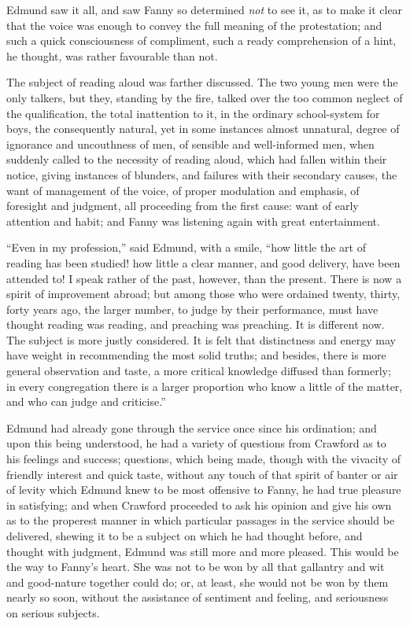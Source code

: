 Edmund saw it all, and saw Fanny so determined \emph{not} to see it,
as to make it clear that the voice was enough to convey
the full meaning of the protestation; and such a quick
consciousness of compliment, such a ready comprehension
of a hint, he thought, was rather favourable than not.

The subject of reading aloud was farther discussed.
The two young men were the only talkers, but they,
standing by the fire, talked over the too common neglect
of the qualification, the total inattention to it, in the
ordinary school-system for boys, the consequently natural,
yet in some instances almost unnatural, degree of ignorance
and uncouthness of men, of sensible and well-informed men,
when suddenly called to the necessity of reading aloud,
which had fallen within their notice, giving instances
of blunders, and failures with their secondary causes,
the want of management of the voice, of proper modulation
and emphasis, of foresight and judgment, all proceeding
from the first cause:  want of early attention and habit;
and Fanny was listening again with great entertainment.

``Even in my profession,'' said Edmund, with a smile,
``how little the art of reading has been studied! how little
a clear manner, and good delivery, have been attended to!
I speak rather of the past, however, than the present.
There is now a spirit of improvement abroad; but among
those who were ordained twenty, thirty, forty years ago,
the larger number, to judge by their performance,
must have thought reading was reading, and preaching
was preaching.  It is different now.  The subject is more
justly considered.  It is felt that distinctness and energy
may have weight in recommending the most solid truths;
and besides, there is more general observation and taste,
a more critical knowledge diffused than formerly;
in every congregation there is a larger proportion
who know a little of the matter, and who can judge
and criticise.''

Edmund had already gone through the service once since
his ordination; and upon this being understood, he had
a variety of questions from Crawford as to his feelings
and success; questions, which being made, though with the
vivacity of friendly interest and quick taste, without any
touch of that spirit of banter or air of levity which Edmund
knew to be most offensive to Fanny, he had true pleasure
in satisfying; and when Crawford proceeded to ask his
opinion and give his own as to the properest manner in which
particular passages in the service should be delivered,
shewing it to be a subject on which he had thought before,
and thought with judgment, Edmund was still more and
more pleased.  This would be the way to Fanny's heart.
She was not to be won by all that gallantry and wit and
good-nature together could do; or, at least, she would
not be won by them nearly so soon, without the assistance
of sentiment and feeling, and seriousness on serious subjects.

